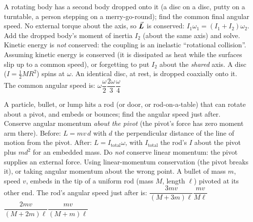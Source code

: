 {A rotating body has a second body dropped onto it (a disc on a disc, putty on a turntable, a person
stepping on a merry-go-round); find the common final angular speed.}
{No external torque about the axis, so $\vec{\bm{L}}$ is conserved: $I_1\omega_1=(I_1+I_2)\omega_2$. Add the
dropped body's moment of inertia $I_2$ (about the same axis) and solve. Kinetic energy is \emph{not}
conserved: the coupling is an inelastic ``rotational collision''.}
{Assuming kinetic energy is conserved (it is dissipated as heat while the surfaces slip up to a common speed), or forgetting
to put $I_2$ about the \emph{shared} axis.}
{A disc ($I=\tfrac{1}{2}MR^2$) spins at $\omega$. An identical disc, at rest, is dropped coaxially onto it.
The common angular speed is:}
{$\omega$}{$\dfrac{\omega}{2}$}{$\dfrac{2\omega}{3}$}{$\dfrac{\omega}{4}$}

{A particle, bullet, or lump hits a rod (or door, or rod-on-a-table) that can rotate about a pivot, and
embeds or bounces; find the angular speed just after.}
{Conserve angular momentum \emph{about the pivot} (the pivot's force has zero moment arm there). Before:
$L=mv\,d$ with $d$ the perpendicular distance of the line of motion from the pivot. After:
$L=I_{\text{total}}\omega$, with $I_{\text{total}}$ the rod's $I$ about the pivot plus $md^2$ for an
embedded mass. Do \emph{not} conserve linear momentum: the pivot supplies an external force.}
{Using linear-momentum conservation (the pivot breaks it), or taking angular momentum about the wrong
point.}
{A bullet of mass $m$, speed $v$, embeds in the tip of a uniform rod (mass $M$, length $\ell$) pivoted at
its other end. The rod's angular speed just after is:}
{$\dfrac{3mv}{(M+3m)\ell}$}{$\dfrac{mv}{M\ell}$}{$\dfrac{2mv}{(M+2m)\ell}$}{$\dfrac{mv}{(M+m)\ell}$}

